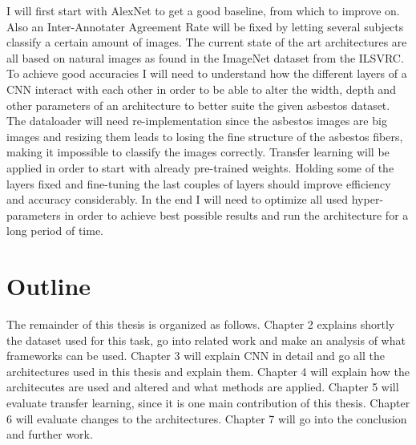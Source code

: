 I will first start with AlexNet to get a good baseline, from which to improve on. Also an Inter-Annotater Agreement Rate will be fixed by letting several subjects classify a certain amount of images. The current state of the art architectures are all based on natural images as found in the ImageNet dataset from the ILSVRC. To achieve good accuracies I will need to understand how the different layers of a CNN interact with each other in order to be able to alter the width, depth and other parameters of an architecture to better suite the given asbestos dataset. The dataloader will need re-implementation since the asbestos images are big images and resizing them leads to losing the fine structure of the asbestos fibers, making it impossible to classify the images correctly. Transfer learning will be applied in order to start with already pre-trained weights. Holding some of the layers fixed and fine-tuning the last couples of layers should improve efficiency and accuracy considerably. In the end I will need to optimize all used hyper-parameters in order to achieve best possible results and run the architecture for a long period of time.

\section{Outline}

The remainder of this thesis is organized as follows. Chapter 2 explains shortly the dataset used for this task, go into related work and make an analysis of what frameworks can be used. Chapter 3 will explain CNN in detail and go  all the architectures used in this thesis and explain them. Chapter 4 will explain how the architecutes are used and altered and what methods are applied. Chapter 5 will evaluate transfer learning, since it is one main contribution of this thesis. Chapter 6 will evaluate changes to the architectures. Chapter 7 will go into the conclusion and further work.
